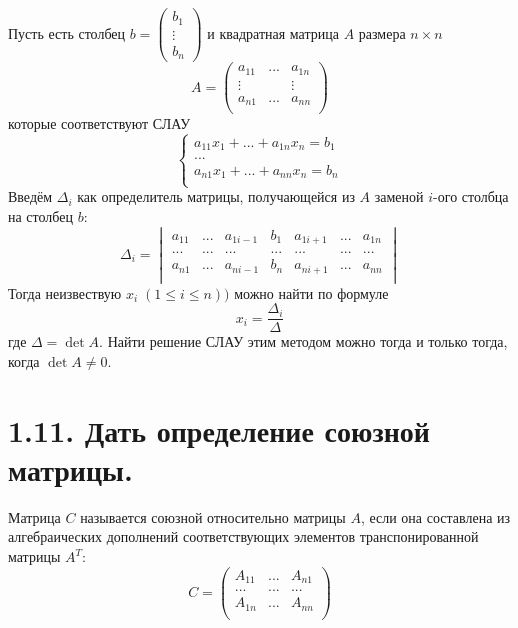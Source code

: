 \documentclass{article}
\begin{document}
Пусть есть столбец $b = \begin{pmatrix} b_1 \\ \vdots \\ b_n \end{pmatrix}$ и квадратная матрица $A$ размера $n \times n$
$$
A = 
\begin{pmatrix}
a_{11} & ... & a_{1n} \\
\vdots &  & \vdots \\
a_{n1} & ... & a_{nn} \\
\end{pmatrix}
$$
которые соответствуют СЛАУ
$$
\begin{cases}
a_{11}x_1 + ... + a_{1n}x_n = b_1 \\
... \\
a_{n1}x_1 + ... + a_{nn}x_n = b_n \\
\end{cases}
$$
Введём $\Delta_i$ как определитель матрицы, получающейся из $A$ заменой $i$-ого столбца на столбец $b$:
$$
\Delta_i = 
\begin{vmatrix}
a_{11} & ... & a_{1i-1} & b_1 & a_{1i+1} & ... & a_{1n} \\
... & ... & ... & ... & ... & ... & ... \\
a_{n1} & ... & a_{ni-1} & b_n & a_{ni+1} & ... & a_{nn} \\
\end{vmatrix}
$$
Тогда неизвествую $x_i \; (1 \le i \le n))$ можно найти по формуле
$$
x_i = \frac{\Delta_i}{\Delta}
$$
где $\Delta = \det{A}$.
\newline Найти решение СЛАУ этим методом можно тогда и только тогда, когда 
\newline $\det{A} \ne 0$.

\section*{\LARGE 1.11. Дать определение союзной матрицы.  }

Матрица $C$ называется союзной относительно матрицы $A$, если она составлена из алгебраических дополнений соответствующих элементов транспонированной матрицы $A^T$:
$$
C = 
\begin{pmatrix}
A_{11} & ... & A_{n1} \\
... & ... & ... \\
A_{1n} & ... & A_{nn} \\
\end{pmatrix}
$$
\end{document}
